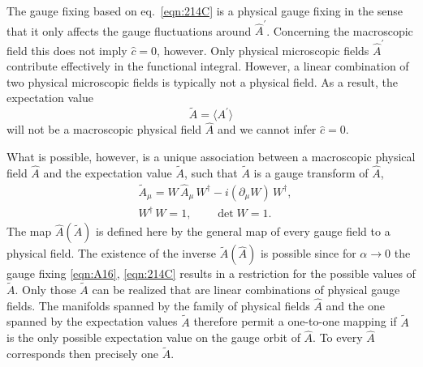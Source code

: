 \documentclass[twocolumn,aps,prd,amsmath,amssymb,preprintnumbers,longbibliography]{revtex4-1}
\numberwithin{equation}{section}
\newenvironment{alignedeqn}{\begin{equation}\begin{aligned}}{\end{aligned}\end{equation}\ignorespacesafterend}
\begin{document}
\begin{appendices}
The gauge fixing based on eq.~\eqref{eqn:214C} is a physical gauge fixing in the sense that it only affects the gauge fluctuations around $\hat{A}^\prime$. Concerning the macroscopic field this does not imply $\hat{c} = 0$, however. Only physical microscopic fields $\hat{A}^\prime$ contribute effectively in the functional integral. However, a linear combination of two physical microscopic fields is typically not a physical field. As a result, the expectation value
\begin{equation}\label{eqn:OG1}
	\tilde{A}
	= \langle A^\prime\rangle
\end{equation}
will not be a macroscopic physical field $\hat{A}$ and we cannot infer $\hat{c} = 0$.

What is possible, however, is a unique association between a macroscopic physical field $\hat{A}$ and the expectation value $\tilde{A}$, such that $\tilde{A}$ is a gauge transform of $\hat{A}$,
\begin{alignedeqn}\label{eqn:OG2}
	&\tilde{A}_\mu
	= W \, \hat{A}_\mu \, W^\dagger - i (\partial_\mu W) \, W^\dagger,\\
	&W^\dagger \, W = 1,
	\qquad
	\det W
	= 1.
\end{alignedeqn}
The map $\hat{A}(\tilde{A})$ is defined here by the general map of every gauge field to a physical field. The existence of the inverse $\tilde{A}(\hat{A})$ is possible since for $\alpha \to 0$ the gauge fixing \eqref{eqn:A16}, \eqref{eqn:214C} results in a restriction for the possible values of $\tilde{A}$. Only those $\tilde{A}$ can be realized that are linear combinations of physical gauge fields. The manifolds spanned by the family of physical fields $\hat{A}$ and the one spanned by the expectation values $\tilde{A}$ therefore permit a one-to-one mapping if $\tilde{A}$ is the only possible expectation value on the gauge orbit of $\hat{A}$. To every $\hat{A}$ corresponds then precisely one $\tilde{A}$.


\end{appendices}
\end{document}
